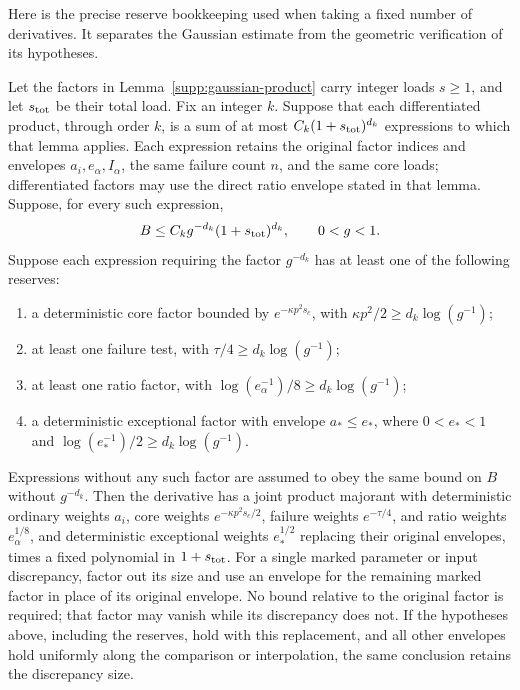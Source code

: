 Here is the precise reserve bookkeeping used when taking a fixed number
of derivatives.  It separates the Gaussian estimate from the geometric
verification of its hypotheses.

\begin{corollary}
\label{supp:product-reserve}
Let the factors in Lemma~\ref{supp:gaussian-product} carry integer loads
$s\ge1$, and let $s_{\rm tot}$ be their total load.  Fix an integer $k$.
Suppose that each differentiated product, through order $k$, is a sum of
at most $C_k(1+s_{\rm tot})^{d_k}$ expressions to which that lemma
applies.  Each expression retains the original factor indices and
envelopes $a_i,e_\alpha,I_\alpha$, the same failure count $n$, and the
same core loads; differentiated factors may use the direct ratio
envelope stated in that lemma.  Suppose, for every such expression,
\[
 B\le C_k g^{-d_k}(1+s_{\rm tot})^{d_k},\qquad 0<g<1.
\]
Suppose each expression requiring the factor $g^{-d_k}$ has at least
one of the following reserves:
\begin{enumerate}
\item a deterministic core factor bounded by
$e^{-\kappa p^2s_c}$, with $\kappa p^2/2\ge d_k\log(g^{-1})$;
\item at least one failure test, with
$\tau/4\ge d_k\log(g^{-1})$;
\item at least one ratio factor, with
$\log(e_\alpha^{-1})/8\ge d_k\log(g^{-1})$;
\item a deterministic exceptional factor with envelope $a_*\le e_*$,
where $0<e_*<1$ and
$\log(e_*^{-1})/2\ge d_k\log(g^{-1})$.
\end{enumerate}
Expressions without any such factor are assumed to obey the same
bound on $B$ without $g^{-d_k}$.  Then the derivative has a joint
product majorant with deterministic ordinary weights $a_i$, core
weights $e^{-\kappa p^2s_c/2}$, failure weights $e^{-\tau/4}$, and
ratio weights $e_\alpha^{1/8}$, and deterministic exceptional weights
$e_*^{1/2}$ replacing their original envelopes, times a fixed polynomial in
$1+s_{\rm tot}$.  For a single marked parameter or input discrepancy,
factor out its size and use an envelope for the remaining marked factor
in place of its original envelope.  No bound relative to the original
factor is required; that factor may vanish while its discrepancy does
not.  If the hypotheses above, including the reserves, hold with this
replacement, and all other envelopes hold uniformly along the comparison
or interpolation, the same conclusion retains the discrepancy size.
\end{corollary}

